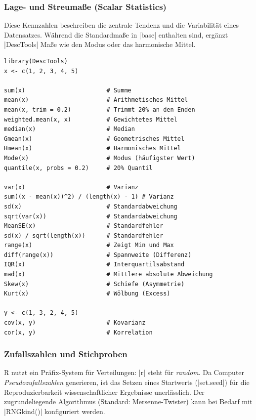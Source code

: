 \documentclass[10pt,twocolumn]{scrartcl}
\renewcommand{\lstinline}{\mycoloredinline}
\begin{document}
\subsubsection{Lage- und Streumaße (Scalar Statistics)}

Diese Kennzahlen beschreiben die zentrale Tendenz und die Variabilität eines Datensatzes. Während die Standardmaße in \lstinline|base| enthalten sind, ergänzt \lstinline|DescTools| Maße wie den Modus oder das harmonische Mittel.

\begin{lstlisting}
library(DescTools)
x <- c(1, 2, 3, 4, 5)

sum(x)                       # Summe
mean(x)                      # Arithmetisches Mittel
mean(x, trim = 0.2)          # Trimmt 20% an den Enden
weighted.mean(x, x)          # Gewichtetes Mittel   
median(x)                    # Median
Gmean(x)                     # Geometrisches Mittel
Hmean(x)                     # Harmonisches Mittel
Mode(x)                      # Modus (häufigster Wert)
quantile(x, probs = 0.2)     # 20% Quantil

var(x)                       # Varianz
sum((x - mean(x))^2) / (length(x) - 1) # Varianz
sd(x)                        # Standardabweichung
sqrt(var(x))                 # Standardabweichung
MeanSE(x)                    # Standardfehler
sd(x) / sqrt(length(x))      # Standardfehler
range(x)                     # Zeigt Min und Max
diff(range(x))               # Spannweite (Differenz)
IQR(x)                       # Interquartilsabstand
mad(x)                       # Mittlere absolute Abweichung
Skew(x)                      # Schiefe (Asymmetrie)
Kurt(x)                      # Wölbung (Excess)

y <- c(1, 3, 2, 4, 5)
cov(x, y)                    # Kovarianz
cor(x, y)                    # Korrelation
\end{lstlisting}


\subsubsection{Zufallszahlen und Stichproben}

R nutzt ein Präfix-System für Verteilungen: \lstinline|r| steht für \emph{random}. Da Computer \emph{Pseudozufallszahlen} generieren, ist das Setzen eines Startwerts (\lstinline|set.seed|) für die Reproduzierbarkeit wissenschaftlicher Ergebnisse unerlässlich. Der zugrundeliegende Algorithmus (Standard: Mersenne-Twister) kann bei Bedarf mit \lstinline|RNGkind()| konfiguriert werden.
\end{document}
